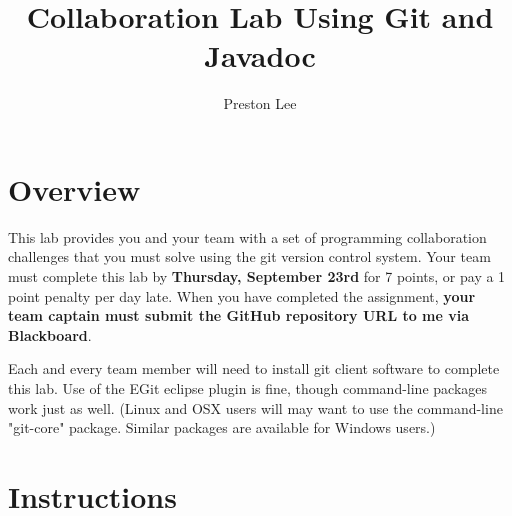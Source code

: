 \documentclass{article}
\author{Preston Lee}
\title{Collaboration Lab Using Git and Javadoc}
\begin{document}

\maketitle

\section{Overview}
This lab provides you and your team with a set of programming collaboration challenges that you must solve using the git version control system.
\footnotemark{} Your team must complete this lab by {\bf Thursday, September 23rd} for 7 points, or pay a 1 point penalty per day late. When you have completed the assignment, {\bf your team captain must submit the GitHub repository URL to me via Blackboard}.

Each and every team member will need to install git client software to complete this lab. Use of the EGit eclipse plugin is fine, though command-line packages work just as well. (Linux and OSX users will may want to use the command-line "git-core" package. Similar packages are available for Windows users.)

\section{Instructions}
\end{document}
